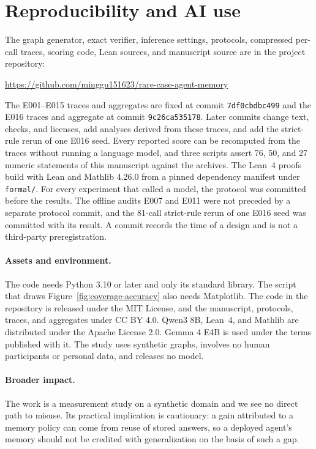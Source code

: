 \documentclass[11pt]{article}
\begin{document}
\section*{Reproducibility and AI use}

The graph generator, exact verifier, inference settings, protocols,
compressed per-call traces, scoring code, Lean sources, and manuscript
source are in the project repository:
\begin{center}
\url{https://github.com/minggu151623/rare-case-agent-memory}
\end{center}
The E001--E015 traces and aggregates are fixed at commit
\texttt{7df0cbdbc499} and the E016 traces and aggregate at commit
\texttt{9c26ca535178}. Later commits change text, checks, and licenses,
add analyses derived from these traces, and add the strict-rule rerun
of one E016 seed.
Every reported score can be recomputed from
the traces without running a language model, and three scripts assert
76, 50, and 27 numeric statements of this manuscript against the archives. The Lean~4
proofs build with Lean and Mathlib 4.26.0 from a pinned dependency
manifest under \texttt{formal/}. For every experiment that called a model, the
protocol was committed before the results. The offline audits E007 and
E011 were not preceded by a separate protocol commit, and the 81-call
strict-rule rerun of one E016 seed was committed with its result. A commit records
the time of a design and is not a third-party preregistration.

\paragraph{Assets and environment.} The code needs Python 3.10 or later
and only its standard library. The script that draws
Figure~\ref{fig:coverage-accuracy} also needs Matplotlib. The code in the repository is released
under the MIT License, and the manuscript, protocols, traces, and
aggregates under CC BY 4.0. Qwen3 8B, Lean~4, and Mathlib are
distributed under the Apache License 2.0. Gemma 4 E4B is used under the
terms published with it. The study uses synthetic graphs, involves no
human participants or personal data, and releases no model.

\paragraph{Broader impact.} The work is a measurement study on a
synthetic domain and we see no direct path to misuse. Its practical
implication is cautionary: a gain attributed to a memory policy can
come from reuse of stored answers, so a deployed agent's memory should
not be credited with generalization on the basis of such a gap.
\end{document}
